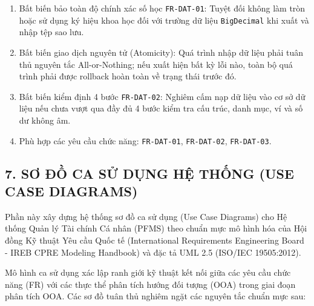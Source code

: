 \documentclass[11pt,a4paper]{article}
\providecommand{\tightlist}{
  \setlength{\itemsep}{0pt}\setlength{\parskip}{0pt}}
\begin{document}
\begin{itemize}
  \begin{enumerate}
  \def\labelenumi{\arabic{enumi}.}
  \tightlist
  \item
    Bất biến bảo toàn độ chính xác số học \texttt{FR-DAT-01}: Tuyệt đối
    không làm tròn hoặc sử dụng ký hiệu khoa học đối với trường dữ liệu
    \texttt{BigDecimal} khi xuất và nhập tệp sao lưu.
  \item
    Bất biến giao dịch nguyên tử (Atomicity): Quá trình nhập dữ liệu
    phải tuân thủ nguyên tắc All-or-Nothing; nếu xuất hiện bất kỳ lỗi
    nào, toàn bộ quá trình phải được rollback hoàn toàn về trạng thái
    trước đó.
  \item
    Bất biến kiểm định 4 bước \texttt{FR-DAT-02}: Nghiêm cấm nạp dữ liệu
    vào cơ sở dữ liệu nếu chưa vượt qua đầy đủ 4 bước kiểm tra cấu trúc,
    danh mục, ví và số dư không âm.
  \item
    Phù hợp các yêu cầu chức năng: \texttt{FR-DAT-01},
    \texttt{FR-DAT-02}, \texttt{FR-DAT-03}.
  \end{enumerate}
\end{itemize}

\clearpage
\subsection{7. SƠ ĐỒ CA SỬ DỤNG HỆ THỐNG (USE CASE
DIAGRAMS)}\label{7-sux1a1-ux111ux1ed3-ca-sux1eed-dux1ee5ng-hux1ec7-thux1ed1ng-use-case-diagrams}

Phần này xây dựng hệ thống sơ đồ ca sử dụng (Use Case Diagrams) cho Hệ
thống Quản lý Tài chính Cá nhân (PFMS) theo chuẩn mực mô hình hóa của
Hội đồng Kỹ thuật Yêu cầu Quốc tế (International Requirements
Engineering Board - IREB CPRE Modeling Handbook) và đặc tả UML 2.5
(ISO/IEC 19505:2012).

Mô hình ca sử dụng xác lập ranh giới kỹ thuật kết nối giữa các yêu cầu
chức năng (FR) với các thực thể phân tích hướng đối tượng (OOA) trong
giai đoạn phân tích OOA. Các sơ đồ tuân thủ nghiêm ngặt các nguyên tắc
chuẩn mực sau:
\end{document}
